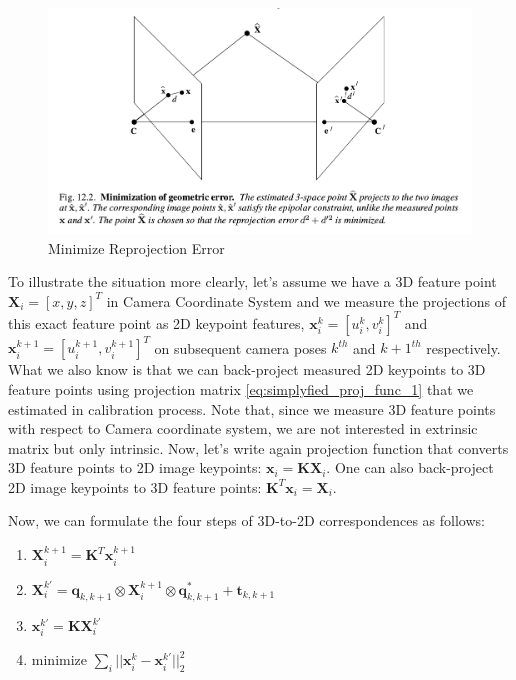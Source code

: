 \documentclass[a4paper]{report}
\numberwithin{figure}{section}
\begin{document}
\begin{figure}[H]
	\centering
  \includegraphics[width=0.7\linewidth,natwidth=640,natheight=640]
  {fig/ref_imgs/min_euclidean_error.png}
  \caption{Minimize Reprojection Error}
	\label{fig:min_geometric_error}
\end{figure}


To illustrate the 
situation more clearly, let's assume we have a 3D feature point 
$\mathbf{X}_i=[x, y, z]^T$ in Camera Coordinate System and we measure 
the projections of this exact feature point as 2D keypoint features, 
$\mathbf{x}_i^k=[u_i^k,v_i^k]^T$ and $\mathbf{x}_i^{k+1}=[u_i^{k+1}, v_i^{k+1}]^T$ 
on subsequent camera poses $k^{th}$ and $k+1^{th}$ respectively. What we also know is that 
we can back-project measured 2D keypoints to 3D feature points using projection 
matrix \ref{eq:simplyfied_proj_func_1} that we estimated in calibration process. 
Note that, since we measure 3D feature points with respect to Camera coordinate system, 
we are not interested in extrinsic matrix but only intrinsic. Now, 
let's write again projection function that converts 3D feature 
points to 2D image keypoints:
$
\mathbf{x}_i = 
  \mathbf{K}\mathbf{X}_i
  $.
One can also back-project 2D image keypoints to 3D feature points:
$
  \mathbf{K}^T\mathbf{x}_{i} = 
  \mathbf{X}_{i} 
  $.

Now, we can formulate the four steps of 3D-to-2D correspondences as follows:

\begin{enumerate}
  \item $\mathbf{X}_{i}^{k+1} = \mathbf{K}^T\mathbf{x}_{i}^{k+1}$
  \item $\mathbf{X}_i^{k'} = 
    \mathbf{q}_{k,k+1} \otimes \mathbf{X}_i^{k+1} \otimes \mathbf{q}_{k,k+1}^* + \mathbf{t}_{k,k+1} $
  \item $\mathbf{x}_i^{k'} = \mathbf{K}\mathbf{X}_i^{k'}$
  \item minimize $\sum_i||\mathbf{x}_i^k - \mathbf{x}_i^{k'}||_2^2$
\end{enumerate}
\end{document}

